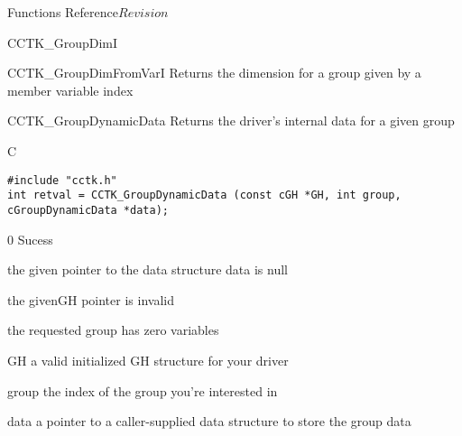 \begin{cactuspart}{ Functions Reference}{}{$Revision$}
\begin{FunctionDescription}{CCTK\_GroupDimI}
\begin{SeeAlsoSection}
\begin{SeeAlso}{CCTK\_GroupDimFromVarI}
Returns the dimension for a group given by a member variable index
\end{SeeAlso}
\end{SeeAlsoSection}
\end{FunctionDescription}


\begin{FunctionDescription}{CCTK\_GroupDynamicData}{}
\label{CCTK-GroupDynamicData}
Returns the driver's internal data for a given group
\begin{SynopsisSection}
\begin{Synopsis}{C}
\begin{verbatim}
#include "cctk.h"
int retval = CCTK_GroupDynamicData (const cGH *GH, int group, cGroupDynamicData *data);
\end{verbatim}
\end{Synopsis}
\end{SynopsisSection}

\begin{ResultSection}
\begin {Result}{0}
Sucess
\end{Result}
\begin{Result}{-1}
the given pointer to the data structure data is null
\end{Result}
\begin{Result}{-3}
the givenGH pointer is invalid
\end{Result}
\begin{Result}{-77}
the requested group has zero variables
\end{Result}
\end{ResultSection}

\begin{ParameterSection}
\begin{Parameter}{GH}
a valid initialized GH structure for your driver
\end{Parameter}
\begin{Parameter}{group}
the index of the group you're interested in
\end{Parameter}
\begin{Parameter}{data}
a pointer to a caller-supplied data structure to store the group data
\end{Parameter}
\end{ParameterSection}


\end{FunctionDescription}
\end{cactuspart}
